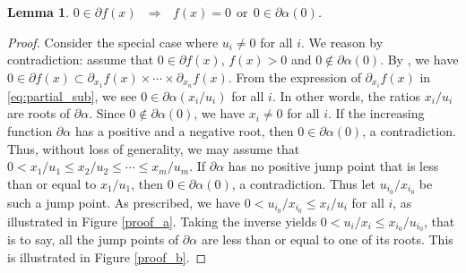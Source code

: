 \documentclass[12pt]{article}
\theoremstyle{definition}
\theoremstyle{plain}
\newtheorem{lemma}{Lemma}
\begin{document}
\begin{lemma}
\label{lemma:step}
\normalfont
$0 \in \partial f(x) ~~~ \Longrightarrow ~~~ f(x) = 0 ~~\text{or}~~ 0 \in \partial \alpha(0)$.
\end{lemma}

\begin{proof}
Consider the special case where $u_i \neq 0$ for all $i$. We reason by contradiction: assume that $0 \in \partial f(x)$, $f(x)>0$ and $0 \notin \partial \alpha(0)$. By \cite[Corollary 10.11]{rockafellar2009variational}, we have $0 \in \partial f(x) \subset \partial_{x_1} f(x) \times \cdots \times \partial_{x_n} f(x)$. From the expression of $\partial_{x_i} f(x)$ in \eqref{eq:partial_sub}, we see $0 \in \partial \alpha (x_i/u_i)$ for all $i$. In other words, the ratios $x_i/u_i$ are roots of $\partial \alpha$. Since $0 \notin \partial \alpha(0)$, we have $x_i \neq 0$ for all $i$. If the increasing function $\partial \alpha$ has a positive and a negative root, then $0 \in \partial \alpha (0)$, a contradiction. Thus, without loss of generality, we may assume that $0 <x_1/u_1\leqslant x_2/u_2 \leqslant \cdots \leqslant x_m/u_m$. If $\partial \alpha$ has no positive jump point that is less than or equal to  $x_1/u_1$, then $0 \in \partial \alpha (0)$, a contradiction. Thus let $u_{i_0}/x_{i_0}$ be such a jump point. As prescribed, we have $0<u_{i_0}/x_{i_0}\leqslant x_i/u_i$ for all $i$, as illustrated in Figure \ref{proof_a}. Taking the inverse yields $0 < u_i/x_i \leqslant x_{i_0}/u_{i_0}$, that is to say, all the jump points of $\partial \alpha$ are less than or equal to one of its roots. This is illustrated in Figure \ref{proof_b}.


\end{proof}
\end{document}
